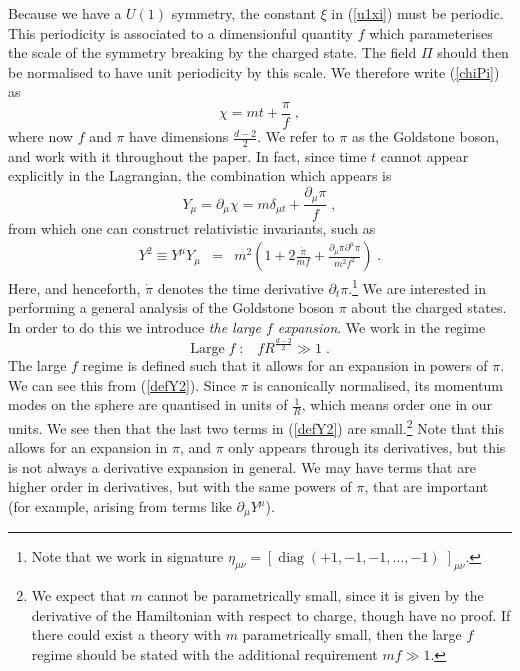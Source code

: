 \documentclass[11pt]{article}
\numberwithin{equation}{section}
\newcommand{\be}{\begin{equation}} \newcommand{\ee}{\end{equation}}
\newcommand{\bea}{\begin{eqnarray}}  \newcommand{\eea}{\end{eqnarray}}
\begin{document}
Because we have a $U(1)$ symmetry, the constant $\xi$ in (\ref{u1xi}) must be periodic. This periodicity is associated to a dimensionful quantity $f$ which parameterises the scale of the symmetry breaking by the charged state. The field $\Pi$ should then be normalised to have unit periodicity by this scale. We therefore write (\ref{chiPi}) as 
\be
\chi = m t + \frac{\pi}{f} \;,
\ee
where now $f$ and $\pi$ have dimensions $\frac{d-2}{2}$. We refer to $\pi$ as the Goldstone boson, and work with it throughout the paper. In fact, since time $t$ cannot appear explicitly in the Lagrangian, the combination which appears is 
\be
Y_{\mu} = \partial_{\mu} \chi = m \delta_{\mu t} + \frac{\partial_{\mu}\pi}{f} \;,
\ee
from which one can construct relativistic invariants, such as
\bea
Y^2 \equiv Y^{\mu} Y_{\mu} &=& m^2 \left(1 + 2\frac{\dot{\pi}}{mf} + \frac{\partial_{\mu} \pi \partial^{\mu} \pi}{m^2f^2} \right)\;.
\label{defY2} 
\eea
Here, and henceforth, $\dot{\pi}$ denotes the time derivative $\partial_t \pi$.\footnote{Note that we work in signature $\eta_{\mu\nu} = \left[\;\mathrm{diag\;} \left(+1,-1,-1,...,-1\right) \;\right]_{\mu\nu}$.} 
We are interested in performing a general analysis of the Goldstone boson $\pi$ about the charged states. In order to do this we introduce {\it the large $f$ expansion}. We work in the regime
\be
\mathrm{Large}\;f\;\mathrm{:\;}\;\; f R^{\frac{d-2}{2}}  \gg 1 \;.
\label{largef}
\ee
The large $f$ regime is defined such that it allows for an expansion in powers of $\pi$. We can see this from (\ref{defY2}). Since $\pi$ is canonically normalised, its momentum modes on the sphere are quantised in units of $\frac{1}{R}$, which means order one in our units. We see then that the last two terms in (\ref{defY2}) are small.\footnote{We expect that $m$ cannot be parametrically small, since it is given by the derivative of the Hamiltonian with respect to charge, though have no proof. If there could exist a theory with $m$ parametrically small, then the large $f$ regime should be stated with the additional requirement $m f \gg 1$.} Note that this allows for an expansion in $\pi$, and $\pi$ only appears through its derivatives, but this is not always a derivative expansion in general. We may have terms that are higher order in derivatives, but with the same powers of $\pi$, that are important (for example, arising from terms like $\partial_{\mu}Y^{\mu}$).
\end{document}
